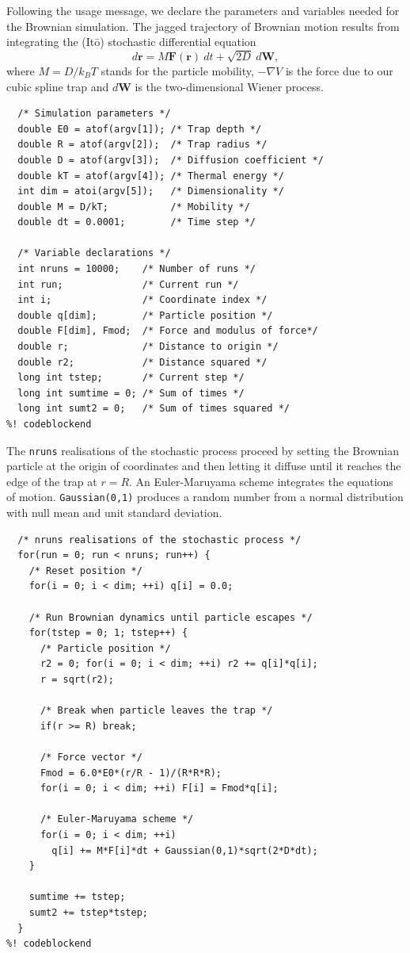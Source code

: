 \documentclass{article}
\begin{document}
Following the usage message, we declare the parameters and variables needed for
the Brownian simulation. The jagged trajectory of Brownian motion results from
integrating the (It\=o) stochastic differential equation
\begin{equation}
  d\mathbf{r} = M \mathbf{F}(\mathbf{r})\ dt + \sqrt{2 D}\ d\mathbf{W},
\end{equation}
where $M = D/k_BT$ stands for the particle mobility, $-\nabla V$ is the force
due to our cubic spline trap and $d\mathbf{W}$ is the two-dimensional Wiener
process.

\begin{lstlisting}[frame=single]
%! codeblock: variable_declarations
  /* Simulation parameters */
  double E0 = atof(argv[1]); /* Trap depth */
  double R = atof(argv[2]);  /* Trap radius */
  double D = atof(argv[3]);  /* Diffusion coefficient */
  double kT = atof(argv[4]); /* Thermal energy */
  int dim = atoi(argv[5]);   /* Dimensionality */
  double M = D/kT;           /* Mobility */
  double dt = 0.0001;        /* Time step */

  /* Variable declarations */
  int nruns = 10000;    /* Number of runs */
  int run;              /* Current run */
  int i;                /* Coordinate index */
  double q[dim];        /* Particle position */
  double F[dim], Fmod;  /* Force and modulus of force*/
  double r;             /* Distance to origin */
  double r2;            /* Distance squared */
  long int tstep;       /* Current step */
  long int sumtime = 0; /* Sum of times */
  long int sumt2 = 0;   /* Sum of times squared */
%! codeblockend
\end{lstlisting}

The \texttt{nruns} realisations of the stochastic process proceed by setting the
Brownian particle at the origin of coordinates and then letting it diffuse until
it reaches the edge of the trap at $r = R$. An Euler-Maruyama scheme integrates
the equations of motion. \texttt{Gaussian(0,1)} produces a random number from a
normal distribution with null mean and unit standard deviation.

\begin{lstlisting}[frame=single]
%! codeblock: Brownian_simulation
  /* nruns realisations of the stochastic process */
  for(run = 0; run < nruns; run++) {
    /* Reset position */
    for(i = 0; i < dim; ++i) q[i] = 0.0;

    /* Run Brownian dynamics until particle escapes */
    for(tstep = 0; 1; tstep++) {
      /* Particle position */
      r2 = 0; for(i = 0; i < dim; ++i) r2 += q[i]*q[i];
      r = sqrt(r2);

      /* Break when particle leaves the trap */
      if(r >= R) break;

      /* Force vector */
      Fmod = 6.0*E0*(r/R - 1)/(R*R*R);
      for(i = 0; i < dim; ++i) F[i] = Fmod*q[i];

      /* Euler-Maruyama scheme */
      for(i = 0; i < dim; ++i)
        q[i] += M*F[i]*dt + Gaussian(0,1)*sqrt(2*D*dt);
    }

    sumtime += tstep;
    sumt2 += tstep*tstep;
  }
%! codeblockend
\end{lstlisting}
\end{document}
